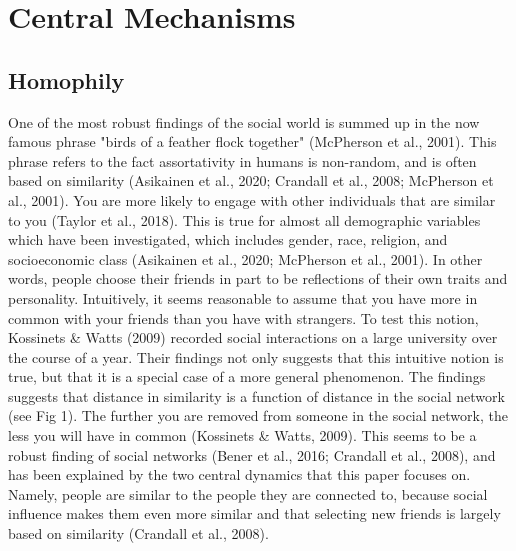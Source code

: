 \documentclass{article}
\begin{document}
\section{Central Mechanisms}
\subsection{Homophily}
One of the most robust findings of the social world is summed up in the now famous phrase "birds of a feather flock together" (McPherson et al., 2001). This phrase refers to the fact assortativity in humans is non-random, and is often based on similarity (Asikainen et al., 2020; Crandall et al., 2008; McPherson et al., 2001). You are more likely to engage with other individuals that are similar to you (Taylor et al., 2018). This is true for almost all demographic variables which have been investigated, which includes gender, race, religion, and socioeconomic class (Asikainen et al., 2020; McPherson et al., 2001). In other words, people choose their friends in part to be reflections of their own traits and personality. 
Intuitively, it seems reasonable to assume that you have more in common with your friends than you have with strangers. To test this notion, Kossinets \& Watts (2009) recorded social interactions on a large university over the course of a year. Their findings not only suggests that this intuitive notion is true, but that it is a special case of a more general phenomenon. The findings suggests that distance in similarity is a function of distance in the social network (see Fig 1). The further you are removed from someone in the social network, the less you will have in common (Kossinets \& Watts, 2009). This seems to be a robust finding of social networks (Bener et al., 2016; Crandall et al., 2008), and has been explained by the two central dynamics that this paper focuses on. Namely, people are similar to the people they are connected to, because social influence makes them even more similar and that selecting new friends is largely based on similarity (Crandall et al., 2008). 
\end{document}
